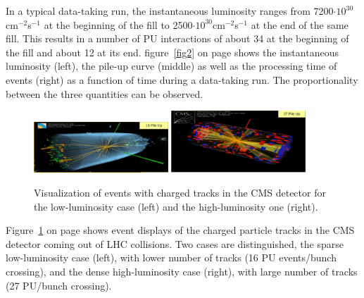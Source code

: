 \documentclass[a4paper]{jpconf}
\begin{document}
In a typical data-taking run, the instantaneous luminosity ranges from 7200$ \cdot 10^{30}$cm$^{-2}$s$^{-1}$ at the beginning of the fill to 2500$ \cdot 10^{30}$cm$^{-2}$s$^{-1}$ at the end of the same fill.  This results in a number of PU interactions of about 34 at the beginning of the fill and about 12 at its end. figure~\ref{fig2} on page \pageref{fig2} shows the instantaneous luminosity (left), the pile-up curve (middle) as well as the processing time of events (right) as a function of time during a data-taking run. The proportionality between the three quantities can be observed.




\begin{figure}[ht]
  \begin{center}
\includegraphics[width=0.45\textwidth,height=0.33\textwidth]{3.pdf}
\includegraphics[width=0.45\textwidth,height=0.33\textwidth]{4.pdf}
\caption{\label{fig3} Visualization of events with charged tracks in the CMS detector for the low-luminosity case (left) and the high-luminosity one (right).}
  \end{center}
\vspace{-8mm}
\end{figure}

Figure~\ref{fig3} on page \pageref{fig3} shows event displays of the charged particle tracks in the CMS detector coming out of LHC collisions. Two cases are distinguished, the sparse low-luminosity case (left), with lower number of tracks (16 PU events/bunch crossing), and the dense high-luminosity case (right), with large number of tracks (27 PU/bunch crossing).
\end{document}
